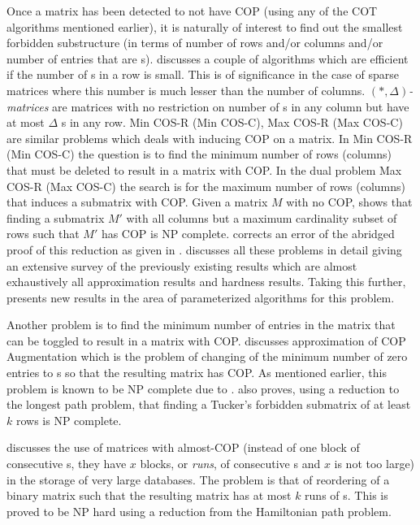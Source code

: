 Once a matrix has been detected to not have COP (using any of the COT
algorithms mentioned earlier), it is naturally of interest to find out
the smallest forbidden substructure (in terms of number of rows and/or
columns and/or number of entries that are {\un}s). \cite{d08phd}
discusses a couple of algorithms which are efficient if the number of
{\un}s in a row is small. This is of significance in the case of
sparse matrices where this number is much lesser than the number of
columns. $(*,\Delta)${\em -matrices} are matrices with no restriction
on number of {\un}s in any column but have at most $\Delta$ {\un}s in
any row. {\sc Min COS-R (Min COS-C), Max COS-R (Max COS-C)} are
similar problems which deals with inducing COP on a matrix. In {\sc
  Min COS-R (Min COS-C)} the question is to find the minimum number of
rows (columns) that must be deleted to result in a matrix with COP.
In the dual problem {\sc Max COS-R (Max COS-C)} the search is for the
maximum number of rows (columns) that induces a submatrix with
COP. Given a matrix $M$ with no COP, \cite{b75-phd} shows that finding
a submatrix $M'$ with all columns but a maximum cardinality
subset of rows such that $M'$ has COP is NP complete. \cite{hg02}
corrects an error of the abridged proof of this reduction as given in
\cite{gj79}.  \cite{d08phd} discusses all these problems in detail
giving an extensive survey of the previously existing results which
are almost exhaustively all approximation results and hardness
results. Taking this further, \cite{d08phd} presents new results in
the area of parameterized algorithms for this
problem.

Another problem is to find the minimum number of entries in the matrix
that can be toggled to result in a matrix with COP.  \cite{v85}
discusses approximation of {\sc COP Augmentation} which is the problem
of changing of the minimum number of zero entries to {\un}s so that
the resulting matrix has COP. As mentioned earlier, this problem is
known to be NP complete due to \cite{b75-phd}. \cite{v85} also proves,
using a reduction to the longest path problem,  that finding a Tucker's forbidden
submatrix of at least $k$ rows is NP complete.   

\cite{jkckv04} discusses the use of matrices with almost-COP (instead
of one block of consecutive {\un}s, they have $x$ blocks, or {\em
  runs}, of consecutive {\un}s and $x$ is not too large) in the
storage of very large databases.  The problem is that of reordering of
a binary matrix such that the resulting matrix has at most $k$ runs of
{\un}s. This is proved to be NP hard using a reduction from the
Hamiltonian path problem.


